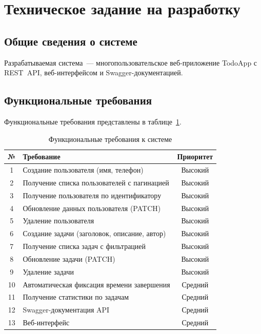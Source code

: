 \documentclass[a4paper,14pt]{extarticle}
\begin{document}
\clearpage
\section{Техническое задание на разработку}

\subsection{Общие сведения о системе}

Разрабатываемая система~--- многопользовательское веб-приложение TodoApp с REST~API, веб-интерфейсом и Swagger-документацией.

\subsection{Функциональные требования}

Функциональные требования представлены в таблице~\ref{tab:func_req}.

\begin{table}[H]
\caption{Функциональные требования к системе}\label{tab:func_req}
\centering
\small
\begin{tabularx}{\textwidth}{|c|X|c|}
\hline
\textbf{№} & \textbf{Требование} & \textbf{Приоритет} \\
\hline
1 & Создание пользователя (имя, телефон) & Высокий \\
\hline
2 & Получение списка пользователей с пагинацией & Высокий \\
\hline
3 & Получение пользователя по идентификатору & Высокий \\
\hline
4 & Обновление данных пользователя (PATCH) & Высокий \\
\hline
5 & Удаление пользователя & Высокий \\
\hline
6 & Создание задачи (заголовок, описание, автор) & Высокий \\
\hline
7 & Получение списка задач с фильтрацией & Высокий \\
\hline
8 & Обновление задачи (PATCH) & Высокий \\
\hline
9 & Удаление задачи & Высокий \\
\hline
10 & Автоматическая фиксация времени завершения & Средний \\
\hline
11 & Получение статистики по задачам & Средний \\
\hline
12 & Swagger-документация API & Средний \\
\hline
13 & Веб-интерфейс & Средний \\
\hline
\end{tabularx}
\end{table}
\end{document}

